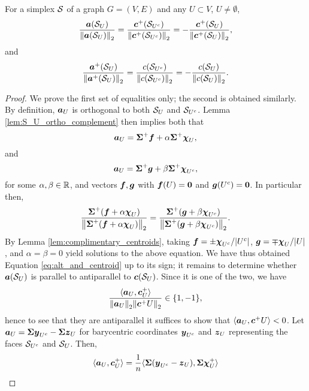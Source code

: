 \begin{lemma}
\label{lem:alt_and_centroid}
For a simplex $\mathcal{S}$ of a graph $G=(V,E)$ and any $U\subset V$, $U\neq\emptyset$, 
\begin{equation}
\label{eq:alt_and_centroid}
    \frac{\vb*{a}(\mathcal{S}_U)}{\norm{\vb*{a}(\mathcal{S}_{U})}_2}=\frac{\vb*{c}^+(\mathcal{S}_{U^c})}{\norm{\vb*{c}^+(\mathcal{S}_{U^c})}_2}=-\frac{\vb*{c}^+(\mathcal{S}_{U})}{\norm{\vb*{c}^+(\mathcal{S}_{U})}_2},
\end{equation}
and 
\begin{equation*}
    \frac{\vb*{a}^+(\mathcal{S}_U)}{\norm{\vb*{a}^+(\mathcal{S}_{U})}_2}=\frac{c(\mathcal{S}_{U^c})}{\norm{c(\mathcal{S}_{U^c})}_2}=-\frac{c(\mathcal{S}_{U})}{\norm{c(\mathcal{S}_{U})}_2}.
\end{equation*}
\end{lemma}
\begin{proof}
We prove the first set of equalities only; the second is obtained similarly. By definition, $\vb*{a}_U$ is orthogonal to both $\mathcal{S}_U$ and $\mathcal{S}_{U^c}$. Lemma \ref{lem:S_U_ortho_complement} then implies both that 
\begin{equation*}
\vb*{a}_U = \boldsymbol{\Sigma}^+\vb*{f} + \alpha \boldsymbol{\Sigma}^+\boldsymbol{\chi}_U,
\end{equation*}
and 
\begin{equation*}
\vb*{a}_U = \boldsymbol{\Sigma}^+\vb*{g} + \beta\boldsymbol{\Sigma}^+\boldsymbol{\chi}_{U^c},
\end{equation*}
for some $\alpha,\beta\in\mathbb{R}$, and vectors $\vb*{f},\vb*{g}$ with $\vb*{f}(U)=\vb{0}$ and $\vb*{g}(U^c)=\vb{0}$. In particular then, 
\begin{equation}
\label{eq:lem_alt_centroid1}
\frac{\boldsymbol{\Sigma}^+(\vb*{f}+\alpha\boldsymbol{\chi}_U)}{\norm{\boldsymbol{\Sigma}^+(\vb*{f}+\alpha\boldsymbol{\chi}_U)}_2}=\frac{\boldsymbol{\Sigma}^+(\vb*{g}+\beta\boldsymbol{\chi}_{U^c})}{\norm{\boldsymbol{\Sigma}^+(\vb*{g}+\beta\boldsymbol{\chi}_{U^c})}_2}.
\end{equation}
By Lemma \ref{lem:complimentary_centroids}, taking $\vb*{f}=\pm\boldsymbol{\chi}_{U^c}/|U^c|$, $\vb*{g}=\mp\boldsymbol{\chi}_U/|U|$, and $\alpha=\beta=0$ yield solutions to the above equation. We have thus obtained Equation \eqref{eq:alt_and_centroid} up to its sign; 
it remains to determine whether $\vb*{a}(\mathcal{S}_U)$ is parallel to antiparallel to $\vb*{c}(\mathcal{S}_U)$. Since it is one of the two, we have 
\[\frac{\langle \vb*{a}_U,\vb*{c}^+_U\rangle}{\norm{\vb*{a}_U}_2\norm{\vb*{c}^+U}_2}\in\{1,-1\},\]
hence to see that they are antiparallel it suffices to show that $\langle \vb*{a}_U,\vb*{c}^+U\rangle<0$. Let $\vb*{a}_U= \boldsymbol{\Sigma}\vb*{y}_{U^c}-\boldsymbol{\Sigma}\vb*{z}_U$ for barycentric coordinates $\vb*{y}_{U^c}$ and $\vb*{z}_U$ representing the faces $\mathcal{S}_{U^c}$ and $\mathcal{S}_U$. Then, 
\begin{align*}
\la \alt_U,\cent^+_U\ra &= \frac{1}{n}\la \Sv(\y_{U^c}-\z_U),\Sv\bchi^+_U\ra \\

\end{align*}
\end{proof}
